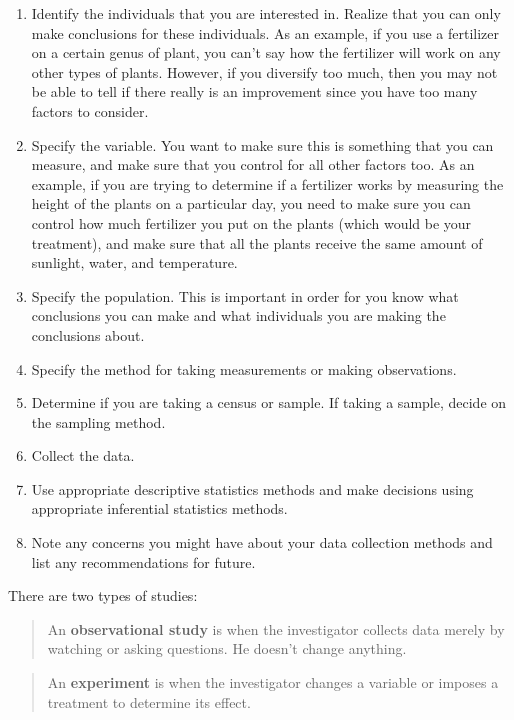 \documentclass[]{book}
\begin{document}
\begin{enumerate}
\def\labelenumi{\arabic{enumi}.}
\item
  Identify the individuals that you are interested in. Realize that you can only make conclusions for these individuals. As an example, if you use a fertilizer on a certain genus of plant, you can't say how the fertilizer will work on any other types of plants. However, if you diversify too much, then you may not be able to tell if there really is an improvement since you have too many factors to consider.
\item
  Specify the variable. You want to make sure this is something that you can measure, and make sure that you control for all other factors too. As an example, if you are trying to determine if a
  fertilizer works by measuring the height of the plants on a particular day, you need to make sure you can control how much fertilizer you put on the plants (which would be your treatment), and make sure that all the plants receive the same amount of sunlight, water, and temperature.
\item
  Specify the population. This is important in order for you know what conclusions you can make and what individuals you are making the conclusions about.
\item
  Specify the method for taking measurements or making observations.
\item
  Determine if you are taking a census or sample. If taking a sample, decide on the sampling method.
\item
  Collect the data.
\item
  Use appropriate descriptive statistics methods and make decisions using appropriate inferential statistics methods.
\item
  Note any concerns you might have about your data collection methods and list any recommendations for future.
\end{enumerate}

There are two types of studies:

\begin{quote}
An \textbf{observational study} is when the investigator collects data merely by watching or asking questions. He doesn't change anything.
\end{quote}

\begin{quote}
An \textbf{experiment} is when the investigator changes a variable or imposes a treatment to determine its effect.
\end{quote}
\end{document}
